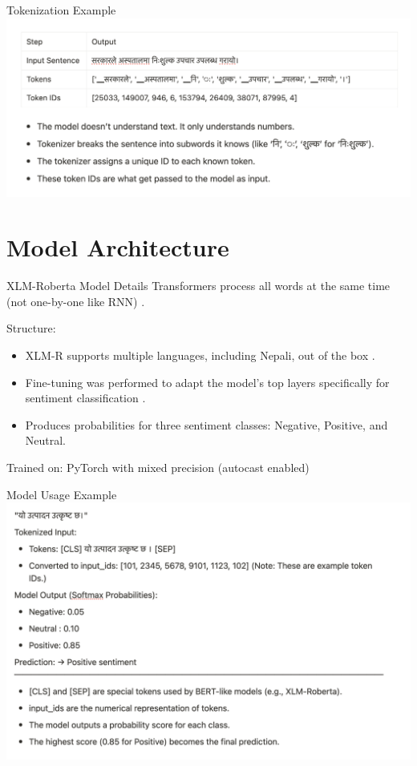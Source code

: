 \documentclass[aspectratio=169]{beamer}
\begin{document}
\begin{frame}{Tokenization Example}
  \centering
  \includegraphics[width=1\linewidth]{example.png}
\end{frame}

\section{Model Architecture}
\begin{frame}{XLM-Roberta Model Details}
  Transformers process all words at the same time (not one-by-one like RNN) \parencite{vaswani2023attentionneed}.

  Structure:
  \begin{itemize}
    \item XLM-R supports multiple languages, including Nepali, out of the box \parencite{conneau-etal-2020-unsupervised}.
    \item Fine-tuning was performed to adapt the model's top layers specifically for sentiment classification \parencite{devlin-etal-2019-bert,liu2019roberta}.
    \item Produces probabilities for three sentiment classes: Negative, Positive, and Neutral.
  \end{itemize}

  Trained on: PyTorch with mixed precision (autocast enabled) \parencite{paszke2019pytorchimperativestylehighperformance,priya2020mixed}
\end{frame}

\begin{frame}{Model Usage Example}
  \centering
  \includegraphics[width=0.65\linewidth]{example2.png}
\end{frame}
\end{document}
